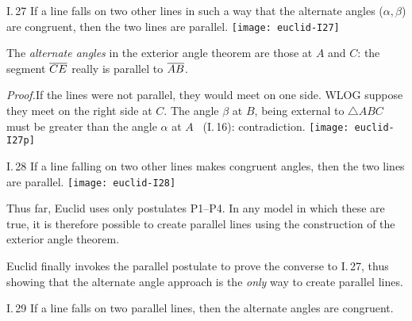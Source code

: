 \begin{thm}[lower separated=false, sidebyside, sidebyside align=top seam, sidebyside gap=0pt, righthand width=0.37\linewidth]{I.\,27}{}
If a line falls on two other lines in such a way that the alternate angles ($\alpha,\beta$) are congruent, then the two lines are parallel.
\tcblower
\flushright\texttt{[image: euclid-I27]}
\end{thm}

The \emph{alternate angles} in the exterior angle theorem are those at $A$ and $C$: the segment $\overline{CE}$ really is parallel to $\overline{AB}$.

\begin{tcolorbox}[proofstyle,lower separated=false, sidebyside, sidebyside align=top seam, sidebyside gap=0pt, righthand width=0.37\linewidth]
\emph{Proof.}\lstsp If the lines were not parallel, they would meet on one side. WLOG suppose they meet on the right side at $C$.\smallbreak
The angle $\beta$ at $B$, being external to $\triangle ABC$ must be greater than the angle $\alpha$ at $A$ \ (I.\,16): contradiction.
\tcblower\flushright\texttt{[image: euclid-I27p]}\\[-12pt]\hfill\qedsymbol
\end{tcolorbox}


\begin{thm}[lower separated=false, sidebyside, sidebyside align=top seam, sidebyside gap=0pt, righthand width=0.37\linewidth]{I.\,28}{}
If a line falling on two other lines makes congruent angles, then the two lines are parallel.
\tcblower
\flushright\texttt{[image: euclid-I28]}
\end{thm}

\goodbreak

Thus far, Euclid uses only postulates P1--P4. In any model in which these are true, it is therefore possible to create parallel lines using the construction of the exterior angle theorem.\par
Euclid finally invokes the parallel postulate to prove the converse to I.\,27, thus showing that the alternate angle approach is the \emph{only} way to create parallel lines.

\begin{thm}{I.\,29}{}
If a line falls on two parallel lines, then the alternate angles are congruent.
\end{thm}

